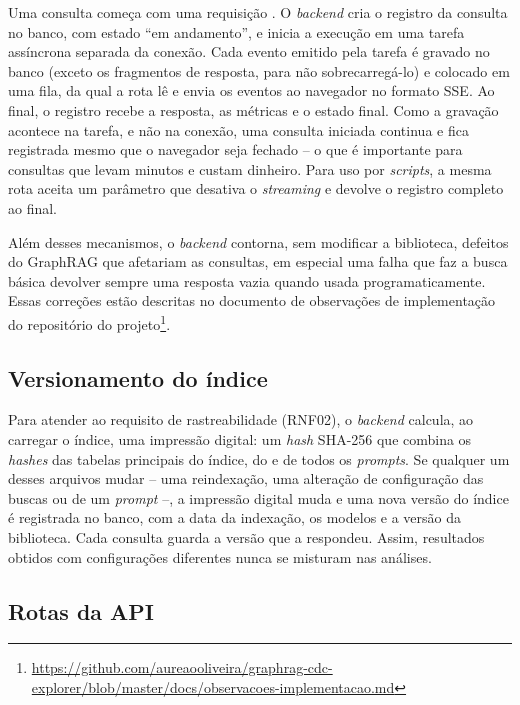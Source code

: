 Uma consulta começa com uma requisição . O \textit{backend} cria o registro da consulta no banco, com estado ``em andamento'', e inicia a execução em uma tarefa assíncrona separada da conexão. Cada evento emitido pela tarefa é gravado no banco (exceto os fragmentos de resposta, para não sobrecarregá-lo) e colocado em uma fila, da qual a rota lê e envia os eventos ao navegador no formato SSE. Ao final, o registro recebe a resposta, as métricas e o estado final. Como a gravação acontece na tarefa, e não na conexão, uma consulta iniciada continua e fica registrada mesmo que o navegador seja fechado -- o que é importante para consultas que levam minutos e custam dinheiro. Para uso por \textit{scripts}, a mesma rota aceita um parâmetro que desativa o \textit{streaming} e devolve o registro completo ao final.

Além desses mecanismos, o \textit{backend} contorna, sem modificar a biblioteca, defeitos do GraphRAG que afetariam as consultas, em especial uma falha que faz a busca básica devolver sempre uma resposta vazia quando usada programaticamente. Essas correções estão descritas no documento de observações de implementação do repositório do projeto\footnote{\url{https://github.com/aureaooliveira/graphrag-cdc-explorer/blob/master/docs/observacoes-implementacao.md}}.

\subsection{Versionamento do índice}
\label{sec-aplicacao-backend-versao}

Para atender ao requisito de rastreabilidade (RNF02), o \textit{backend} calcula, ao carregar o índice, uma impressão digital: um \textit{hash} SHA-256 que combina os \textit{hashes} das tabelas principais do índice, do  e de todos os \textit{prompts}. Se qualquer um desses arquivos mudar -- uma reindexação, uma alteração de configuração das buscas ou de um \textit{prompt} --, a impressão digital muda e uma nova versão do índice é registrada no banco, com a data da indexação, os modelos e a versão da biblioteca. Cada consulta guarda a versão que a respondeu. Assim, resultados obtidos com configurações diferentes nunca se misturam nas análises.

\subsection{Rotas da API}
\label{sec-aplicacao-backend-rotas}

